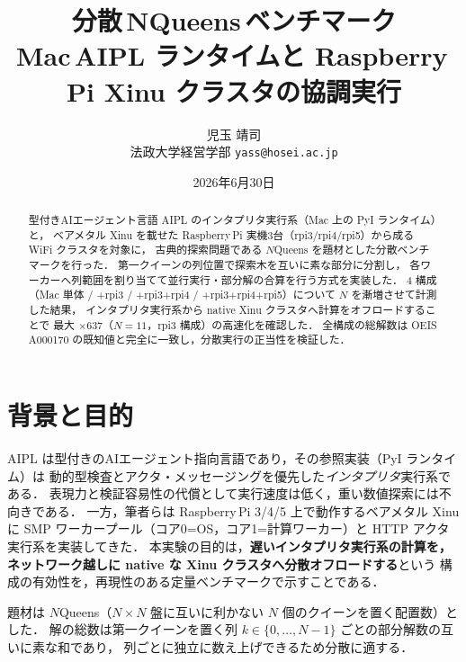 \documentclass[11pt,a4paper]{article}
\title{\bfseries 分散\,N\textendash Queens\,ベンチマーク\\[2pt]
\large Mac\,AIPL ランタイムと Raspberry\,Pi Xinu クラスタの協調実行}
\author{児玉 靖司\\ \small 法政大学経営学部 \quad\texttt{yass@hosei.ac.jp}}
\date{2026年6月30日}
\begin{document}
\maketitle

\begin{abstract}
\normalsize
型付きAIエージェント言語 AIPL のインタプリタ実行系（Mac 上の Py\textendash I ランタイム）と，
ベアメタル Xinu を載せた Raspberry\,Pi 実機3台（rpi3/rpi4/rpi5）から成る WiFi クラスタを対象に，
古典的探索問題である $N$\textendash Queens を題材とした分散ベンチマークを行った．
第一クイーンの列位置で探索木を互いに素な部分に分割し，
各ワーカーへ列範囲を割り当てて並行実行・部分解の合算を行う方式を実装した．
4 構成（Mac 単体 / +rpi3 / +rpi3+rpi4 / +rpi3+rpi4+rpi5）について $N$ を漸増させて計測した結果，
インタプリタ実行系から native Xinu クラスタへ計算をオフロードすることで
最大 $\times$637（$N=11$，rpi3 構成）の高速化を確認した．
全構成の総解数は OEIS A000170 の既知値と完全に一致し，分散実行の正当性を検証した．
\end{abstract}

\section{背景と目的}
AIPL は型付きのAIエージェント指向言語であり，その参照実装（Py\textendash I ランタイム）は
動的型検査とアクタ・メッセージングを優先した\emph{インタプリタ}実行系である．
表現力と検証容易性の代償として実行速度は低く，重い数値探索には不向きである．
一方，筆者らは Raspberry\,Pi 3/4/5 上で動作するベアメタル Xinu に
SMP ワーカープール（コア0=OS，コア1=計算ワーカー）と
HTTP アクタ実行系を実装してきた．
本実験の目的は，\textbf{遅いインタプリタ実行系の計算を，
ネットワーク越しに native な Xinu クラスタへ分散オフロードする}という
構成の有効性を，再現性のある定量ベンチマークで示すことである．

題材は $N$\textendash Queens（$N\times N$ 盤に互いに利かない $N$ 個のクイーンを置く配置数）とした．
解の総数は第一クイーンを置く列 $k\in\{0,\dots,N-1\}$ ごとの部分解数の互いに素な和であり，
列ごとに独立に数え上げできるため分散に適する．
\end{document}
